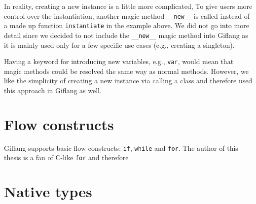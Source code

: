 In reality, creating a new instance is a little more complicated, To give users more control over the instantiation, another magic method \texttt{\_\_new\_\_}
is called instead of a made up function \texttt{instantiate} in the example above. We did not go into more detail since we decided to not include the
\texttt{\_\_new\_\_} magic method into Giflang as it is mainly used only for a few specific use cases (e.g., creating a singleton).

Having a keyword for introducing new variables, e.g., \texttt{var}, would mean that magic methods could be resolved the same way as normal methods. However,
we like the simplicity of creating a new instance via calling a class and therefore used this approach in Giflang as well.

\section{Flow constructs}
Giflang supports basic flow constructs: \texttt{if}, \texttt{while} and \texttt{for}. The author of this thesis is a fan of C-like \texttt{for} and therefore


\section{Native types}
